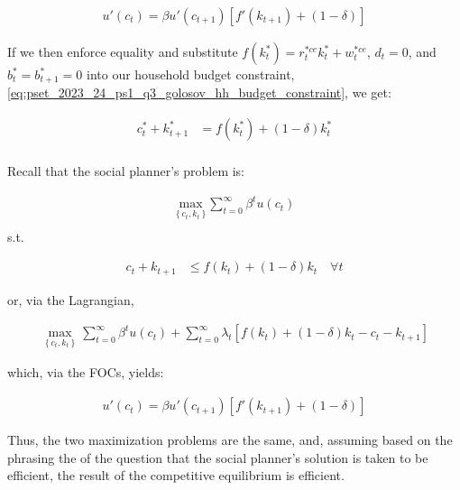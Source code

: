 \begin{align}
    u'(c_t) = \beta u'(c_{t+1})[f'(k_{t+1}) + (1 - \delta)] \label{eq:pset_2023_24_ps1_q3_golosov_euler2}
\end{align}

If we then enforce equality and substitute $f(k^*_{t}) = r^{*ce}_t k_t^* + w^{*ce}_t$, $d_t = 0$,
and $b^*_t = b^*_{t+1} = 0$ into our household budget constraint, \eqref{eq:pset_2023_24_ps1_q3_golosov_hh_budget_constraint},
we get:

\begin{align}
    c_t^* + k_{t+1}^* &= f(k^*_{t}) + (1 - \delta)k_t^* \\
\end{align}

Recall that the social planner's problem is:

\begin{align}
    \underset{\left\{c_t, k_t\right\}}{\text{max}} \sum_{t = 0}^\infty \beta^t u(c_t) \\
\end{align}
s.t.

\begin{align}
    c_t + k_{t+1} &\leq f(k_t) + (1 - \delta)k_t \quad \forall t
\end{align}

or, via the Lagrangian,

\begin{align}
    \max_{\left\{c_t, k_t\right\}} \sum_{t = 0}^\infty \beta^t u(c_t) + \sum_{t=0}^\infty \lambda_t\left[f(k_t) + (1 - \delta)k_t - c_t - k_{t+1}\right]
\end{align}

which, via the FOCs, yields: 

\begin{align}
    u'(c_t) = \beta u'(c_{t+1})[f'(k_{t+1}) + (1 - \delta)] 
\end{align}

Thus, the two maximization problems are the same, and, assuming based 
on the phrasing the of the question that the social planner's 
solution is taken to be efficient, the result of the 
competitive equilibrium is efficient.



